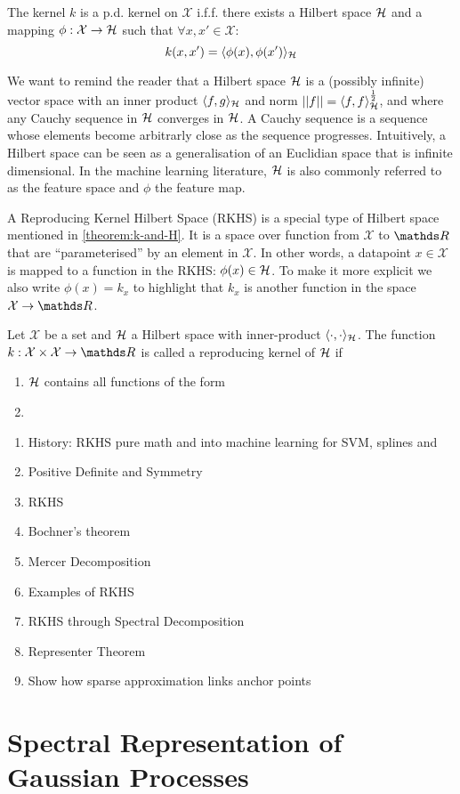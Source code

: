 \begin{theorem}
  \label{theorem:k-and-H}
  The kernel $k$ is a p.d. kernel on $\mathcal{X}$ i.f.f. there exists a Hilbert space ${\mathcal{H}}$ and a mapping $\phi: \mathcal{X} \rightarrow {\mathcal{H}}$ such that $\forall x,x' \in \mathcal{X}$:
  \begin{equation}
    k(x, x') = \langle \phi(x), \phi(x') \rangle_{{\mathcal{H}}}
  \end{equation}
\end{theorem}

We want to remind the reader that a Hilbert space ${\mathcal{H}}$ is a (possibly infinite) vector space with an inner product $\langle f, g \rangle_{{\mathcal{H}}}$ and norm $\lvert\lvert f\rvert\rvert = \langle f, f \rangle_{{\mathcal{H}}}^{\frac{1}{2}}$, and where any Cauchy sequence in ${\mathcal{H}}$ converges in ${\mathcal{H}}$. A Cauchy sequence is a sequence whose elements become arbitrarly close as the sequence progresses. Intuitively, a Hilbert space can be seen as a generalisation of an Euclidian space that is infinite dimensional. In the machine learning literature, ${\mathcal{H}}$ is also commonly referred to as the feature space and $\phi$ the feature map.

A Reproducing Kernel Hilbert Space (RKHS) is a special type of Hilbert space mentioned in \cref{theorem:k-and-H}. It is a space over function from $\mathcal{X}$ to $\Reals$ that are ``parameterised'' by an element in $\mathcal{X}$. In other words, a datapoint $x \in \mathcal{X}$ is mapped to a function in the RKHS: $\phi(x) \in {\mathcal{H}}$. To make it more explicit we also write $\phi(x) = k_x$ to highlight that $k_x$ is another function in the space $\mathcal{X} \rightarrow \Reals$.

\begin{definition}
  Let $\mathcal{X}$ be a set and ${\mathcal{H}}$ a Hilbert space with inner-product $\langle \cdot, \cdot \rangle_{{\mathcal{H}}}$. The function $k: \mathcal{X} \times \mathcal{X} \rightarrow \Reals$ is called a reproducing kernel of ${\mathcal{H}}$ if
  \begin{enumerate}
    \item ${\mathcal{H}}$ contains all functions of the form 
    \item 
  \end{enumerate}
\end{definition}

\begin{enumerate}
  \item History: RKHS pure math and into machine learning for SVM, splines and 
  \item Positive Definite and Symmetry
  \item RKHS
  \item Bochner's theorem
  \item Mercer Decomposition
  \item Examples of RKHS
  \item RKHS through Spectral Decomposition
  \item Representer Theorem
  \item Show how sparse approximation links anchor points
\end{enumerate}

\section{Spectral Representation of Gaussian Processes}
